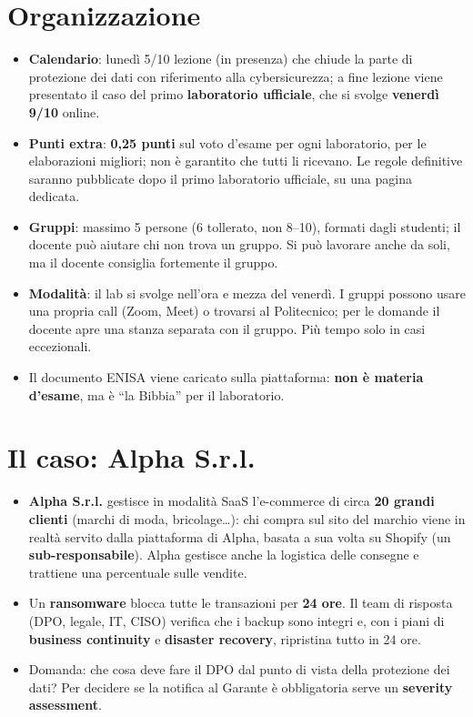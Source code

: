 \section{Organizzazione}
\begin{itemize}
  \item \textbf{Calendario}: lunedì 5/10 lezione (in presenza) che chiude la parte di protezione dei
    dati con riferimento alla cybersicurezza; a fine lezione viene presentato il caso del primo
    \textbf{laboratorio ufficiale}, che si svolge \textbf{venerdì 9/10} online.
  \item \textbf{Punti extra}: \textbf{0,25 punti} sul voto d'esame per ogni laboratorio, per le
    elaborazioni migliori; non è garantito che tutti li ricevano. Le regole definitive saranno pubblicate
    dopo il primo laboratorio ufficiale, su una pagina dedicata.
  \item \textbf{Gruppi}: massimo 5 persone (6 tollerato, non 8--10), formati dagli studenti; il docente
    può aiutare chi non trova un gruppo. Si può lavorare anche da soli, ma il docente consiglia
    fortemente il gruppo.
  \item \textbf{Modalità}: il lab si svolge nell'ora e mezza del venerdì. I gruppi possono usare una
    propria call (Zoom, Meet) o trovarsi al Politecnico; per le domande il docente apre una stanza
    separata con il gruppo. Più tempo solo in casi eccezionali.
  \item Il documento ENISA viene caricato sulla piattaforma: \textbf{non è materia d'esame}, ma è ``la
    Bibbia'' per il laboratorio.
\end{itemize}

\section{Il caso: Alpha S.r.l.}
\begin{itemize}
  \item \textbf{Alpha S.r.l.} gestisce in modalità SaaS l'e-commerce di circa \textbf{20 grandi
    clienti} (marchi di moda, bricolage\ldots): chi compra sul sito del marchio viene in realtà servito
    dalla piattaforma di Alpha, basata a sua volta su Shopify (un \textbf{sub-responsabile}). Alpha
    gestisce anche la logistica delle consegne e trattiene una percentuale sulle vendite.
  \item Un \textbf{ransomware} blocca tutte le transazioni per \textbf{24 ore}. Il team di risposta
    (DPO, legale, IT, CISO) verifica che i backup sono integri e, con i piani di \textbf{business
    continuity} e \textbf{disaster recovery}, ripristina tutto in 24 ore.
  \item Domanda: che cosa deve fare il DPO dal punto di vista della protezione dei dati? Per decidere se
    la notifica al Garante è obbligatoria serve un \textbf{severity assessment}.
\end{itemize}


